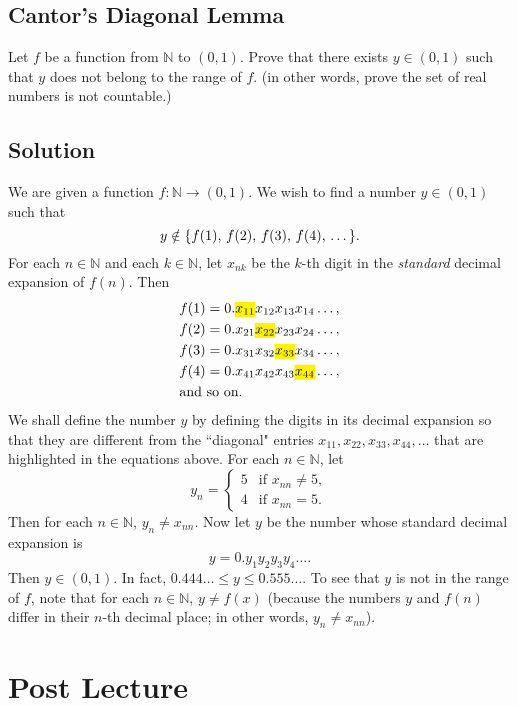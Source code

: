 \documentclass{article}
\begin{document}
\subsection*{Cantor's Diagonal Lemma}
    Let $f$ be a function from $\mathbb{N}$ to $(0, 1)$. Prove that there exists $y \in (0, 1)$ such that $y$ does not belong to the range of $f$. (in other words, prove the set of real numbers is not countable.)

\subsection*{Solution}
    We are given a function $f: \mathbb{N} \rightarrow (0, 1)$. We wish to find a number $y \in (0, 1)$ such that $$y \notin \{\text{$f(1)$, $f(2)$, $f(3)$, $f(4)$, \dots}\}.$$ For each $n \in \mathbb{N}$ and each $k \in \mathbb{N}$, let $x_{nk}$ be the $k$-th digit in the \textit{standard} decimal expansion of $f(n)$. Then 
    \begin{align*}
        &f(1) = 0.\text{\hl{$x_{11}$}}x_{12}x_{13}x_{14}\dots, \\
        &f(2) = 0.x_{21}\text{\hl{$x_{22}$}}x_{23}x_{24}\dots, \\
        &f(3) = 0.x_{31}x_{32}\text{\hl{$x_{33}$}}x_{34}\dots, \\
        &f(4) = 0.x_{41}x_{42}x_{43}\text{\hl{$x_{44}$}}\dots, \\
        &\text{and so on}.
    \end{align*}
    We shall define the number $y$ by defining the digits in its decimal expansion so that they are different from the ``diagonal" entries $x_{11}, x_{22}, x_{33}, x_{44}, \dots$ that are highlighted in the equations above. For each $n \in \mathbb{N}$, let
    $$y_n = 
    \begin{cases}
        5 & \text{if } x_{nn} \ne 5, \\
        4 & \text{if } x_{nn} = 5.
    \end{cases}$$
    Then for each $n \in \mathbb{N}$, $y_n \ne x_{nn}$. Now let $y$ be the number whose standard decimal expansion is $$y = 0.y_1y_2y_3y_4 \dots.$$ Then $y \in (0, 1)$. In fact, $0.444 \ldots \le y \le 0.555 \dots$. To see that $y$ is not in the range of $f$, note that for each $n \in \mathbb{N}$, $y \ne f(x)$ (because the numbers $y$ and $f(n)$ differ in their $n$-th decimal place; in other words, $y_n \ne x_{nn}$).

\section*{Post Lecture}
 
\end{document}
